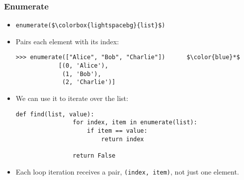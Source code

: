 \documentclass[presentation]{beamer}
\begin{document}
%		
%				
%				
%			
%			
%				
%				
%				
%	

	\begin{frame}[fragile]
		\frametitle{Enumerate}
		
		\begin{itemize}
			\item \lstinline|enumerate($\colorbox{lightspacebg}{list}$)|
			
			\item Pairs each element with its index:
			\begin{lstlisting}[xleftmargin=\dimexpr-\leftmargini]
			>>> enumerate(["Alice", "Bob", "Charlie"])      $\color{blue}*$
			[(0, 'Alice'),
			 (1, 'Bob'),
			 (2, 'Charlie')]
			\end{lstlisting}
			
			\item We can use it to iterate over the list: 
			\begin{lstlisting}[xleftmargin=\dimexpr-\leftmargini]
			def find(list, value):
			    for index, item in enumerate(list):
			        if item == value:
			            return index
			
			    return False
			\end{lstlisting}
			
			\item Each loop iteration receives a pair, \lstinline|(index, item)|, not just one element.
		\end{itemize}
		
	\end{frame}
	
\end{document}

